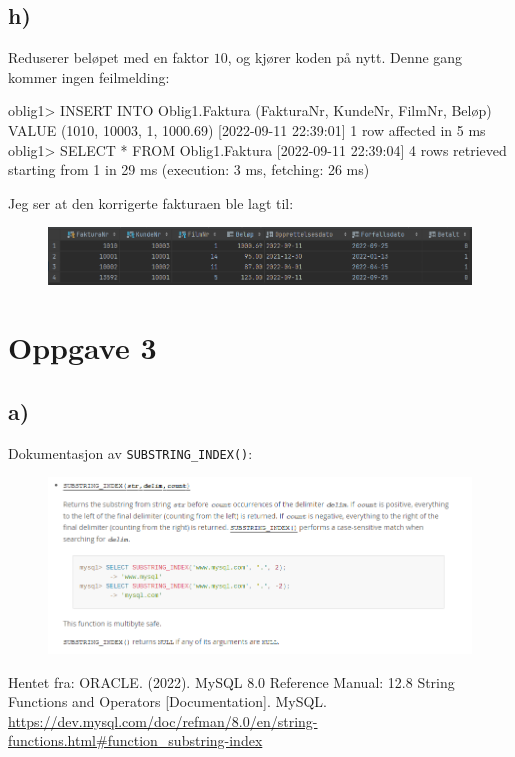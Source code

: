 \documentclass[%
notitlepage,
 amsmath,amssymb,
 aps,
rmp,
]{revtex4-2}  %
\begin{document}
\subsection*{h)}
Reduserer beløpet med en faktor \(10\), og kjører koden på nytt. Denne gang kommer ingen feilmelding:
\begin{sql}
oblig1> INSERT INTO Oblig1.Faktura (FakturaNr, KundeNr, FilmNr, Beløp)
        VALUE (1010, 10003, 1, 1000.69)
[2022-09-11 22:39:01] 1 row affected in 5 ms
oblig1> SELECT *
        FROM Oblig1.Faktura
[2022-09-11 22:39:04] 4 rows retrieved starting from 1 in 29 ms (execution: 3 ms, fetching: 26 ms)
\end{sql}
Jeg ser at den korrigerte fakturaen ble lagt til:
\begin{figure}[H]
\centering\includegraphics[width=\columnwidth]{op2h.png}
\end{figure}

\newpage
\section*{Oppgave 3}
\subsection*{a)}
Dokumentasjon av \verb+SUBSTRING_INDEX()+:
\begin{figure}[H]
\centering\includegraphics[width=\columnwidth]{op3a.png}
\end{figure}
Hentet fra:
ORACLE. (2022). MySQL 8.0 Reference Manual: 12.8 String Functions and Operators [Documentation]. MySQL. \url{https://dev.mysql.com/doc/refman/8.0/en/string-functions.html#function_substring-index}
\end{document}

